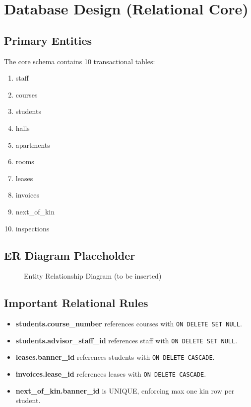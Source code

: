 \documentclass[11pt,a4paper]{article}
\begin{document}
\section{Database Design (Relational Core)}
\subsection{Primary Entities}
The core schema contains 10 transactional tables:
\begin{enumerate}
  \item staff
  \item courses
  \item students
  \item halls
  \item apartments
  \item rooms
  \item leases
  \item invoices
  \item next\_of\_kin
  \item inspections
\end{enumerate}

\subsection{ER Diagram Placeholder}
\begin{figure}[h]
\centering
{}
\caption{Entity Relationship Diagram (to be inserted)}
\label{fig:erd-placeholder}
\end{figure}

\subsection{Important Relational Rules}
\begin{itemize}
  \item \textbf{students.course\_number} references courses with \texttt{ON DELETE SET NULL}.
  \item \textbf{students.advisor\_staff\_id} references staff with \texttt{ON DELETE SET NULL}.
  \item \textbf{leases.banner\_id} references students with \texttt{ON DELETE CASCADE}.
  \item \textbf{invoices.lease\_id} references leases with \texttt{ON DELETE CASCADE}.
  \item \textbf{next\_of\_kin.banner\_id} is UNIQUE, enforcing max one kin row per student.
\end{itemize}
\end{document}
